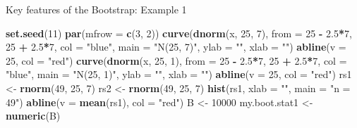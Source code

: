 \documentclass[
  ignorenonframetext,
]{beamer}
\newenvironment{Shaded}{\begin{snugshade}}{\end{snugshade}}
\newcommand{\AttributeTok}[1]{\textcolor[rgb]{0.13,0.29,0.53}{#1}}
\newcommand{\DecValTok}[1]{\textcolor[rgb]{0.00,0.00,0.81}{#1}}
\newcommand{\FloatTok}[1]{\textcolor[rgb]{0.00,0.00,0.81}{#1}}
\newcommand{\FunctionTok}[1]{\textcolor[rgb]{0.13,0.29,0.53}{\textbf{#1}}}
\newcommand{\NormalTok}[1]{#1}
\newcommand{\OtherTok}[1]{\textcolor[rgb]{0.56,0.35,0.01}{#1}}
\newcommand{\SpecialCharTok}[1]{\textcolor[rgb]{0.81,0.36,0.00}{\textbf{#1}}}
\newcommand{\StringTok}[1]{\textcolor[rgb]{0.31,0.60,0.02}{#1}}
\begin{document}
\begin{frame}[fragile]{Key features of the Bootstrap: Example 1}
\label{key-features-of-the-bootstrap-example-1-1}
\tiny

\begin{Shaded}
\begin{Highlighting}[]
\FunctionTok{set.seed}\NormalTok{(}\DecValTok{11}\NormalTok{)}
\FunctionTok{par}\NormalTok{(}\AttributeTok{mfrow =} \FunctionTok{c}\NormalTok{(}\DecValTok{3}\NormalTok{, }\DecValTok{2}\NormalTok{))}
\FunctionTok{curve}\NormalTok{(}\FunctionTok{dnorm}\NormalTok{(x, }\DecValTok{25}\NormalTok{, }\DecValTok{7}\NormalTok{), }\AttributeTok{from =} \DecValTok{25} \SpecialCharTok{{-}} \FloatTok{2.5}\SpecialCharTok{*}\DecValTok{7}\NormalTok{, }\DecValTok{25} \SpecialCharTok{+} \FloatTok{2.5}\SpecialCharTok{*}\DecValTok{7}\NormalTok{, }\AttributeTok{col =} \StringTok{"blue"}\NormalTok{, }\AttributeTok{main =} \StringTok{"N(25, 7)"}\NormalTok{, }\AttributeTok{ylab =} \StringTok{""}\NormalTok{, }\AttributeTok{xlab =} \StringTok{""}\NormalTok{)}
\FunctionTok{abline}\NormalTok{(}\AttributeTok{v =} \DecValTok{25}\NormalTok{, }\AttributeTok{col =} \StringTok{"red"}\NormalTok{)}
\FunctionTok{curve}\NormalTok{(}\FunctionTok{dnorm}\NormalTok{(x, }\DecValTok{25}\NormalTok{, }\DecValTok{1}\NormalTok{), }\AttributeTok{from =} \DecValTok{25} \SpecialCharTok{{-}} \FloatTok{2.5}\SpecialCharTok{*}\DecValTok{7}\NormalTok{, }\DecValTok{25} \SpecialCharTok{+} \FloatTok{2.5}\SpecialCharTok{*}\DecValTok{7}\NormalTok{, }\AttributeTok{col =} \StringTok{"blue"}\NormalTok{, }\AttributeTok{main =} \StringTok{"N(25, 1)"}\NormalTok{, }\AttributeTok{ylab =} \StringTok{""}\NormalTok{, }\AttributeTok{xlab =} \StringTok{""}\NormalTok{)}
\FunctionTok{abline}\NormalTok{(}\AttributeTok{v =} \DecValTok{25}\NormalTok{, }\AttributeTok{col =} \StringTok{"red"}\NormalTok{)}
\NormalTok{rs1 }\OtherTok{\textless{}{-}} \FunctionTok{rnorm}\NormalTok{(}\DecValTok{49}\NormalTok{, }\DecValTok{25}\NormalTok{, }\DecValTok{7}\NormalTok{)}
\NormalTok{rs2 }\OtherTok{\textless{}{-}} \FunctionTok{rnorm}\NormalTok{(}\DecValTok{49}\NormalTok{, }\DecValTok{25}\NormalTok{, }\DecValTok{7}\NormalTok{)}
\FunctionTok{hist}\NormalTok{(rs1, }\AttributeTok{xlab =} \StringTok{""}\NormalTok{, }\AttributeTok{main =} \StringTok{"n = 49"}\NormalTok{)}
\FunctionTok{abline}\NormalTok{(}\AttributeTok{v =} \FunctionTok{mean}\NormalTok{(rs1), }\AttributeTok{col =} \StringTok{"red"}\NormalTok{)}
\NormalTok{B }\OtherTok{\textless{}{-}} \DecValTok{10000}
\NormalTok{my.boot.stat1 }\OtherTok{\textless{}{-}} \FunctionTok{numeric}\NormalTok{(B)}

\end{Highlighting}
\end{Shaded}
\end{frame}
\end{document}
